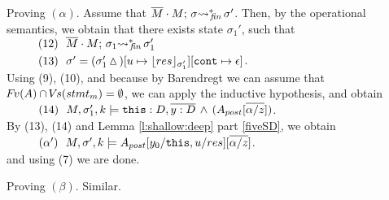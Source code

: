 {\begin{description}
 \vspace{.1cm}
Proving $(\alpha)$. Assume that   $\leadstoBoundedStarFin  {\Mtwo\cdot M}  {\sigma}  {\sigma'}$. Then, by the operational semantics, we obtain that 
there exists state $\sigma_1'$, such that \\
$\SPS (12) \ \ \leadstoBoundedStarFin  {\Mtwo\cdot M}  {\sigma_1}  {\sigma_1'}$ \\
$\SPS (13) \ \ \sigma'=(\sigma_1'\popSymbol)[u \mapsto {\interpret {\sigma_1'} {res}}][\prg{cont}\mapsto \epsilon]$.
\\
Using (9), (10), and because by Barendregt we can assume that $\fv(A)\cap \vs(stmt_m) = \emptyset$, we can apply the inductive hypothesis, and obtain\\
$\SPS (14) \ \  \satDAssertFrom M  {\sigma_1'} {k}   {\prg{this}:D,\overline{y:D}\, \wedge\, (A_{post}[\overline{\alpha/z}])}$.
\\
By (13), (14) and Lemma  \ref{l:shallow:deep} part \ref{fiveSD}, we obtain\\
$\SPS (\alpha') \ \  \satDAssertFrom M  {\sigma'} {k}   {A_{post}[y_0/ \prg{this},u/res][\overline{\alpha/z}]}$.\\
and using (7) we are done.

 \vspace{.1cm}
Proving $(\beta)$. Similar.


\end{description}}
